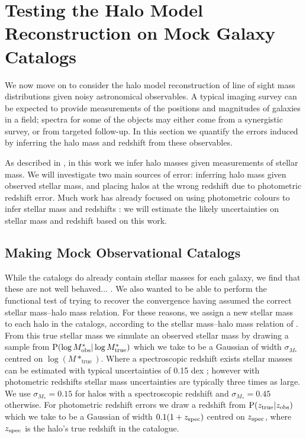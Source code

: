 \documentclass[useAMS,usenatbib]{mn2e}
\begin{document}

\section{Testing the Halo Model Reconstruction on Mock Galaxy Catalogs}
\label{sec:obsMstar+z}

We now move on to consider the halo model reconstruction of line of sight mass
distributions given noisy astronomical observables. A typical imaging survey
can be expected to provide measurements of the positions and magnitudes of
galaxies in a field;  spectra for some of the objects may either come from a
synergistic survey, or from targeted follow-up. In this section we quantify
the errors induced by inferring the halo mass and redshift from these
observables. 

As described in , in this work we infer halo masses
given measurements of stellar mass. We will investigate two main sources of
error: inferring halo mass given observed stellar mass, and placing halos at
the wrong redshift due to photometric redshift error. Much work has already
focused on using photometric colours to infer stellar mass
\citep[\eg][]{AugerEtal2009} and redshifts \citep[\eg][]{BPZ}: we will
estimate the likely uncertainties on stellar mass and redshift based on this
work.  

\subsection{Making Mock Observational Catalogs}

While the \MS catalogs do already contain stellar masses for each galaxy, we
find that these are not well behaved... . We also wanted to be able to perform the functional test of
trying to recover the convergence having assumed the correct stellar
mass--halo mass relation. For these reasons, we assign a new stellar mass to
each halo in the \MS catalogs, according to the stellar mass--halo mass
relation of  \citet{BehrooziEtal2010}. From this true  stellar mass we
simulate an observed stellar mass by drawing a sample from 
${\rm P}(\log{M^{*}_{\rm obs}}|\log{M^{*}_{\rm true}})$ which we take to be a
Gaussian of width $\sigma_{M_*}$ centred on $\log(M*_{\mathrm {true}})$. Where
a spectroscopic redshift exists stellar masses can be estimated with typical
uncertainties of 0.15 dex \citep{AugerEtal2009}; however with photometric
redshifts stellar mass uncertainties are typically three times as large. We
use $\sigma_{M_*}=0.15$ for halos with a spectroscopic redshift and
$\sigma_{M_*}=0.45$ otherwise. For photometric redshift errors we draw a
redshift from ${\rm P}(z_{\rm true}|z_{\rm obs})$ which we take to be a Gaussian
of width $0.1(1+z_{\rm spec})$ centred on $z_{\rm spec}$, where $z_{\rm spec}$
is the halo's true redshift in the \MS catalogue.
\end{document}
